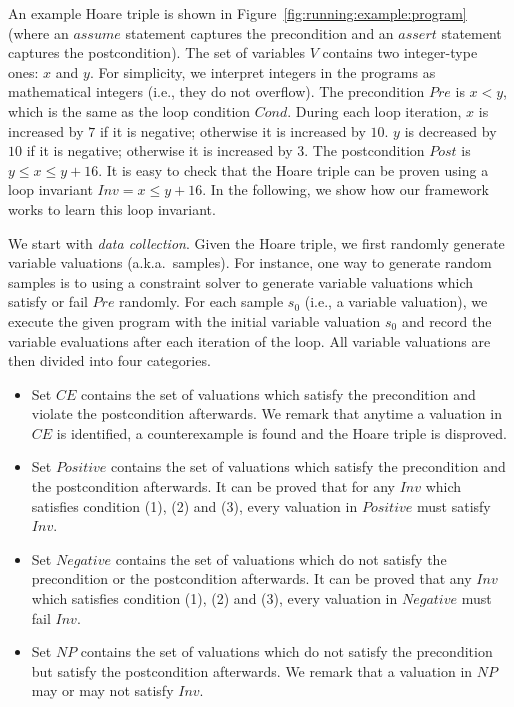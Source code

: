 \begin{example}
An example Hoare triple is shown in Figure~\ref{fig:running:example:program} (where an $assume$ statement captures the precondition and an $assert$ statement captures the postcondition). The set of variables $V$ contains two integer-type ones: $x$ and $y$. For simplicity, we interpret integers in the programs as mathematical integers (i.e., they do not overflow). The precondition $Pre$ is $x < y$, which is the same as the loop condition $Cond$.
During each loop iteration, $x$ is increased by $7$ if it is negative; otherwise it is increased by $10$. $y$ is decreased by $10$ if it is negative; otherwise it is increased by $3$. The postcondition $Post$ is $y \le x \le y + 16$. It is easy to check that the Hoare triple can be proven using a loop invariant $Inv = x \le y + 16$. In the following, we show how our framework works to learn this loop invariant.
\end{example}
We start with \emph{data collection}. Given the Hoare triple, we first randomly generate variable valuations (a.k.a.~samples). For instance, one way to generate random samples is to using a constraint solver to generate variable valuations which satisfy or fail $Pre$ randomly. For each sample $s_0$ (i.e., a variable valuation), we execute the given program with the initial variable valuation $s_0$ and record the variable evaluations after each iteration of the loop. %
All variable valuations are then divided into four categories.
\begin{itemize}
    \item Set $CE$ contains the set of valuations which satisfy the precondition and violate the postcondition afterwards. We remark that anytime a valuation in $CE$ is identified, a counterexample is found and the Hoare triple is disproved.
    \item Set $Positive$ contains the set of valuations which satisfy the precondition and the postcondition afterwards. It can be proved that for any $Inv$ which satisfies condition (1), (2) and (3), every valuation in $Positive$ must satisfy $Inv$.
    \item Set $Negative$ contains the set of valuations which do not satisfy the precondition or the postcondition afterwards. It can be proved that any $Inv$ which satisfies condition (1), (2) and (3), every valuation in $Negative$ must fail $Inv$.
    \item Set $NP$ contains the set of valuations which do not satisfy the precondition but satisfy the postcondition afterwards. We remark that a valuation in $NP$ may or may not satisfy $Inv$.
\end{itemize}
